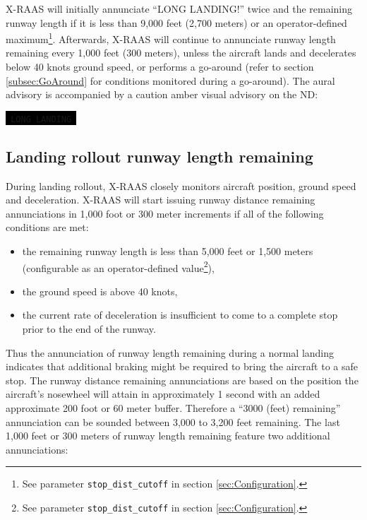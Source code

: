 \documentclass[a4paper,12pt]{article}
\newcommand{\visualadvisory}[3][b]{%
    \ifthenelse{\equal{#1}{b}}{\begin{center}}{}
    \noindent
    \colorbox{black}{\textcolor{#2visualadvisorycolor}{\large\texttt{~#3~}}}
    \ifthenelse{\equal{#1}{b}}{\end{center}}{}}
\newcommand{\confopt}[1]{\texttt{#1}}
\begin{document}
X-RAAS will initially annunciate ``LONG LANDING!'' twice and the
remaining runway length if it is less than 9,000 feet (2,700 meters) or
an operator-defined maximum\footnote{See parameter
\confopt{stop\_dist\_cutoff} in section \ref{sec:Configuration}.}.
Afterwards, X-RAAS will continue to annunciate runway length remaining
every 1,000 feet (300 meters), unless the aircraft lands and decelerates
below 40 knots ground speed, or performs a go-around (refer to section
\ref{subsec:GoAround} for conditions monitored during a go-around). The
aural advisory is accompanied by a caution amber visual advisory on the
ND:

\visualadvisory{nonroutine}{LONG LANDING}

\subsection{Landing rollout runway length remaining}
\label{subsec:LandRolloutMon}

During landing rollout, X-RAAS closely monitors aircraft position, ground
speed and deceleration. X-RAAS will start issuing runway distance
remaining annunciations in 1,000 foot or 300 meter increments if all of
the following conditions are met:

\begin{itemize}

\item the remaining runway length is less than 5,000 feet or 1,500 meters
(configurable as an operator-defined value\footnote{See parameter
\confopt{stop\_dist\_cutoff} in section \ref{sec:Configuration}.}),

\item the ground speed is above 40 knots,

\item the current rate of deceleration is insufficient to come to a
complete stop prior to the end of the runway.

\end{itemize}

\noindent Thus the annunciation of runway length remaining during a
normal landing indicates that additional braking might be required to
bring the aircraft to a safe stop. The runway distance remaining
annunciations are based on the position the aircraft's nosewheel will
attain in approximately 1 second with an added approximate 200 foot or 60
meter buffer. Therefore a ``3000 (feet) remaining'' annunciation can be
sounded between 3,000 to 3,200 feet remaining. The last 1,000 feet or 300
meters of runway length remaining feature two additional annunciations:
\end{document}
